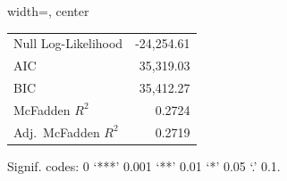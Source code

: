 \begin{table}[pos=H]
\begin{adjustbox}{width=\textwidth, center}
\begin{tabular}{lrrrlrrr}
\multicolumn{4}{l}{Null Log-Likelihood} & \multicolumn{4}{r}{-24,254.61}\\
\multicolumn{4}{l}{AIC} & \multicolumn{4}{r}{35,319.03}\\
\multicolumn{4}{l}{BIC} & \multicolumn{4}{r}{35,412.27}\\
\multicolumn{4}{l}{McFadden $R^2$} & \multicolumn{4}{r}{0.2724}\\
\multicolumn{4}{l}{Adj.\ McFadden $R^2$} & \multicolumn{4}{r}{0.2719}\\ 
\bottomrule
\end{tabular}
\end{adjustbox}
\begin{minipage}{\textwidth}\footnotesize
Signif. codes: 0 `***' 0.001 `**' 0.01 `*' 0.05 `.' 0.1.
\end{minipage}
\end{table}
